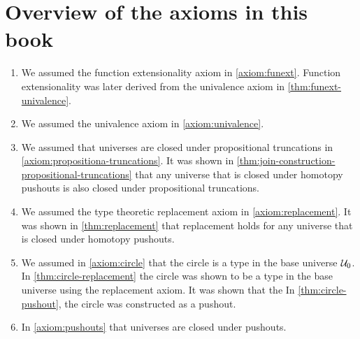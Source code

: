 \chapter{Overview of the axioms in this book}

\begin{enumerate}
\item We assumed the function extensionality axiom in \cref{axiom:funext}. Function extensionality was later derived from the univalence axiom in \cref{thm:funext-univalence}.
\item We assumed the univalence axiom in \cref{axiom:univalence}.
\item We assumed that universes are closed under propositional truncations in \cref{axiom:propositiona-truncations}. It was shown in \cref{thm:join-construction-propositional-truncations} that any universe that is closed under homotopy pushouts is also closed under propositional truncations.
\item We assumed the type theoretic replacement axiom in \cref{axiom:replacement}. It was shown in \cref{thm:replacement} that replacement holds for any universe that is closed under homotopy pushouts.
\item We assumed in \cref{axiom:circle} that the circle is a type in the base universe $\mathcal{U}_0$. In \cref{thm:circle-replacement} the circle was shown to be a type in the base universe using the replacement axiom. It was shown that the In \cref{thm:circle-pushout}, the circle was constructed as a pushout.
\item In \cref{axiom:pushouts} that universes are closed under pushouts.
\end{enumerate}